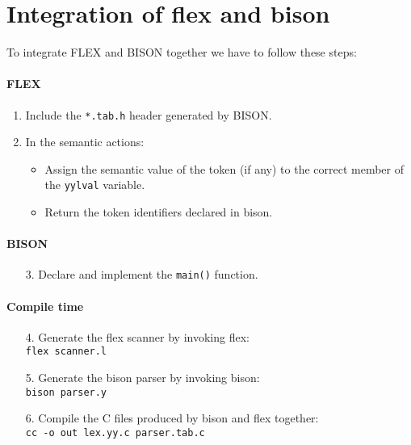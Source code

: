 \section{Integration of flex and bison}
To integrate FLEX and BISON together we have to follow these steps: 

\paragraph*{FLEX}
\begin{enumerate}
    \item Include the \texttt{*.tab.h} header generated by BISON. 
    \item In the semantic actions:
        \begin{itemize}
            \item Assign the semantic value of the token (if any) to the correct member of the \texttt{yylval} variable.
            \item Return the token identifiers declared in bison.
        \end{itemize}
\end{enumerate}

\paragraph*{BISON}
\begin{enumerate}
    \item [3.] Declare and implement the \texttt{main()} function. 
\end{enumerate}

\paragraph*{Compile time}
\begin{enumerate}
    \item [4.] Generate the flex scanner by invoking flex: \\ \texttt{flex scanner.l}
    \item [5.] Generate the bison parser by invoking bison: \\ \texttt{bison parser.y}
    \item [6.] Compile the C files produced by bison and flex together: \\ \texttt{cc -o out lex.yy.c parser.tab.c} 
\end{enumerate}